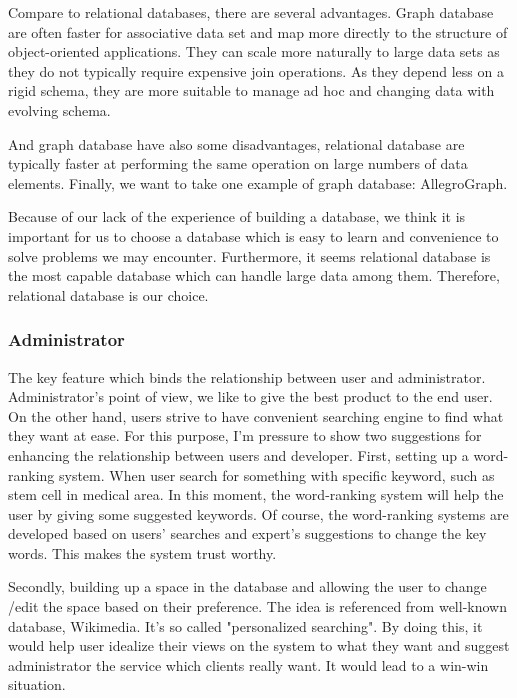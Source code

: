Compare to relational databases, there are several advantages. Graph database are often faster for associative data set and map more directly to the structure of object-oriented applications. They can scale more naturally to large data sets as they do not typically require expensive join operations. As they depend less on a rigid schema, they are more suitable to manage ad hoc and changing data with evolving schema.

And graph database have also some disadvantages, relational database are typically faster at performing the same operation on large numbers of data elements. Finally, we want to take one example of graph database: AllegroGraph. 

Because of our lack of the experience of building a database, we think it is important for us to choose a database which is easy to learn and convenience to solve problems we may encounter. Furthermore, it seems relational database is the most capable database which can handle large data among them. Therefore, relational database is our choice.


\subsubsection*{Administrator}
The key feature which binds the relationship between user and administrator. Administrator's point of view, we like to give the best product to the end user. On the other hand, users strive to have convenient searching engine to find what they want at ease. For this purpose, I'm pressure to show two suggestions for enhancing the relationship between users and developer. First, setting up a word-ranking system. When user search for something with specific keyword, such as stem cell in medical area. In this moment, the word-ranking system will help the user by giving some suggested keywords. Of course, the word-ranking systems are developed based on users' searches and expert's suggestions to change the key words. This makes the system trust worthy.
 
Secondly, building up a space in the database and allowing the user to change /edit the space based on their preference. The idea is referenced from well-known database, Wikimedia. It's so called "personalized searching".  By doing this, it would help user idealize their views on the system to what they want and suggest administrator the service which clients really want. It would lead to a win-win situation. 
	
	
